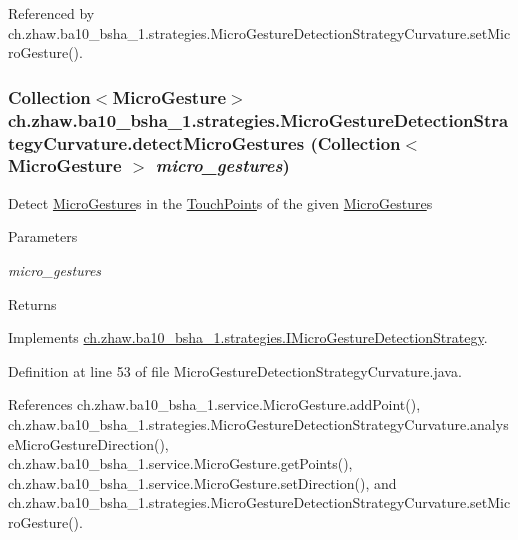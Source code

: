 Referenced by ch.zhaw.ba10\_\-bsha\_\-1.strategies.MicroGestureDetectionStrategyCurvature.setMicroGesture().\hypertarget{classch_1_1zhaw_1_1ba10__bsha__1_1_1strategies_1_1MicroGestureDetectionStrategyCurvature_a939545a8c5597d693f4857a8f6195fc9}{
\subsubsection[{detectMicroGestures}]{\setlength{\rightskip}{0pt plus 5cm}Collection$<${\bf MicroGesture}$>$ ch.zhaw.ba10\_\-bsha\_\-1.strategies.MicroGestureDetectionStrategyCurvature.detectMicroGestures (Collection$<$ {\bf MicroGesture} $>$ {\em micro\_\-gestures})}}
\label{classch_1_1zhaw_1_1ba10__bsha__1_1_1strategies_1_1MicroGestureDetectionStrategyCurvature_a939545a8c5597d693f4857a8f6195fc9}
Detect \hyperlink{}{MicroGesture}s in the \hyperlink{classch_1_1zhaw_1_1ba10__bsha__1_1_1TouchPoint}{TouchPoint}s of the given \hyperlink{}{MicroGesture}s


\begin{DoxyParams}{Parameters}
\item[{\em micro\_\-gestures}]\end{DoxyParams}
\begin{DoxyReturn}{Returns}

\end{DoxyReturn}


Implements \hyperlink{interfacech_1_1zhaw_1_1ba10__bsha__1_1_1strategies_1_1IMicroGestureDetectionStrategy_a8593331fb67e5d4dc890d3db9f2d1b58}{ch.zhaw.ba10\_\-bsha\_\-1.strategies.IMicroGestureDetectionStrategy}.

Definition at line 53 of file MicroGestureDetectionStrategyCurvature.java.

References ch.zhaw.ba10\_\-bsha\_\-1.service.MicroGesture.addPoint(), ch.zhaw.ba10\_\-bsha\_\-1.strategies.MicroGestureDetectionStrategyCurvature.analyseMicroGestureDirection(), ch.zhaw.ba10\_\-bsha\_\-1.service.MicroGesture.getPoints(), ch.zhaw.ba10\_\-bsha\_\-1.service.MicroGesture.setDirection(), and ch.zhaw.ba10\_\-bsha\_\-1.strategies.MicroGestureDetectionStrategyCurvature.setMicroGesture().

